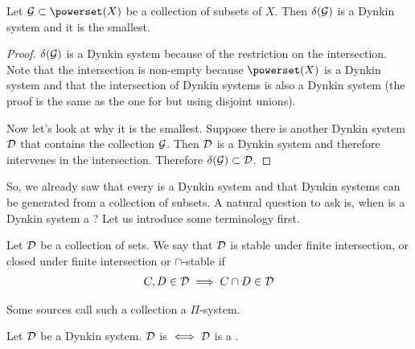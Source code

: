 \begin{lem}
	Let $\calG \subset \powerset(X)$ be a collection of subsets of $X$. Then $\delta(\mathcal{G})$ is a Dynkin system and it is the smallest.
\end{lem}

\begin{proof}
	$\delta(\mathcal{G})$ is a Dynkin system because of the restriction on the intersection. Note that the intersection is non-empty because $\powerset(X)$ is a Dynkin system and that the intersection of Dynkin systems is also a Dynkin system (the proof is the same as the one for \sigas but using disjoint unions).
	
	Now let's look at why it is the smallest. Suppose there is another Dynkin system $\mathcal{D}$ that contains the collection $\mathcal{G}$. Then $\mathcal{D}$ is a Dynkin system and therefore intervenes in the intersection. Therefore $\delta(\mathcal{G}) \subset \mathcal{D}$.
\end{proof}

So, we already saw that every \siga is a Dynkin system and that Dynkin systems can be generated from a collection of subsets. A natural question to ask is, when is a Dynkin system a \siga? Let us introduce some terminology first.


\begin{dfn}
	\label{dfn:istable}
	Let $\mathcal{D}$ be a collection of sets. We say that $\mathcal{D}$ is stable under finite intersection, or closed under finite intersection or $\cap$-stable if
	\begin{align*}
	C, D \in \mathcal{D} \implies C \cap D \in \mathcal{D}
	\end{align*}
	
	Some sources call such a collection a $\Pi$-system.
\end{dfn}

\begin{lem}
	Let $\mathcal{D}$ be a Dynkin system. $\mathcal{D}$ is \istable $\iff \mathcal{D}$ is a \siga.
\end{lem}

